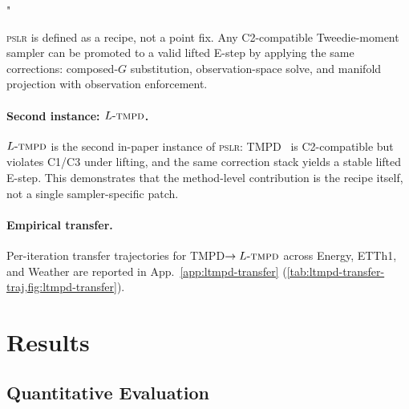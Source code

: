 "\documentclass{article}
\theoremstyle{plain}
\theoremstyle{definition}
\theoremstyle{remark}
\newcommand{\pslr}{\textsc{pslr}}
\newcommand{\ltmpd}{L\mbox{-}\textsc{tmpd}}
\begin{document}
\pslr{} is defined as a recipe, not a point fix. Any C2-compatible Tweedie-moment sampler can be promoted to a valid lifted E-step by applying the same corrections: composed-$G$ substitution, observation-space solve, and manifold projection with observation enforcement.

\paragraph{Second instance: $\ltmpd$.}
$\ltmpd$ is the second in-paper instance of \pslr{}: TMPD~\citep{boys2023tmpd} is C2-compatible but violates C1/C3 under lifting, and the same correction stack yields a stable lifted E-step. This demonstrates that the method-level contribution is the recipe itself, not a single sampler-specific patch.

\paragraph{Empirical transfer.}
Per-iteration transfer trajectories for TMPD$\to\ltmpd$ across Energy, ETTh1, and Weather are reported in App.~\ref{app:ltmpd-transfer} (\cref{tab:ltmpd-transfer-traj,fig:ltmpd-transfer}).

\vspace{-2mm}
\section{Results}
\label{sec:results}
\vspace{-1mm}

\vspace{-1mm}
\subsection{Quantitative Evaluation}
\label{sec:quant-results}
\vspace{-1mm}
\end{document}
